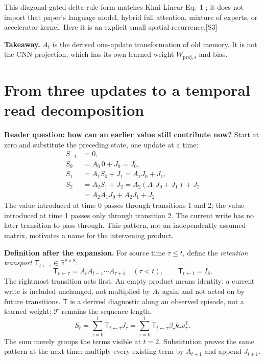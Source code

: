 \documentclass[10pt,letterpaper]{article}
\newcommand{\R}{\mathbb{R}}
\newcommand{\src}[1]{\textcolor{accent}{\textsf{[#1]}}}
\newcommand{\takeaway}[1]{\par\smallskip\noindent\textbf{Takeaway.} #1}
\newcommand{\psection}[1]{\clearpage\section{#1}}
\begin{document}
This diagonal-gated delta-rule form matches Kimi Linear Eq.~1 \cite{kda}; it does not import that paper's language model, hybrid full attention, mixture of experts, or accelerator kernel. Here it is an explicit small spatial recurrence.\src{S3}
\takeaway{$A_t$ is the derived one-update transformation of old memory. It is not the CNN projection, which has its own learned weight $W_{\mathrm{proj},s}$ and bias.}

\psection{From three updates to a temporal read decomposition}
\textbf{Reader question: how can an earlier value still contribute now?}
Start at zero and substitute the preceding state, one update at a time:
\begin{align}
S_{-1}&=0,\\
S_0&=A_0\,0+J_0=J_0,\\
S_1&=A_1S_0+J_1=A_1J_0+J_1,\\
S_2&=A_2S_1+J_2=A_2(A_1J_0+J_1)+J_2\\
&=A_2A_1J_0+A_2J_1+J_2.
\end{align}
The value introduced at time 0 passes through transitions 1 and 2; the value introduced at time 1 passes only through transition 2. The current write has no later transition to pass through. This pattern, not an independently assumed matrix, motivates a name for the intervening product.

\textbf{Definition after the expansion.} For source time $\tau\leq t$, define the \emph{retention transport} $\mathsf T_{t\leftarrow\tau}\in\R^{8\times8}$:
\begin{equation}
\mathsf T_{t\leftarrow\tau}=A_tA_{t-1}\cdots A_{\tau+1}\quad(\tau<t),\qquad
\mathsf T_{t\leftarrow t}=I_8.
\end{equation}
The rightmost transition acts first. An empty product means identity: a current write is included unchanged, not multiplied by $A_t$ again and not acted on by future transitions. $\mathsf T$ is a derived diagnostic along an observed episode, not a learned weight; $\mathcal T$ remains the sequence length.
\begin{equation}
S_t=\sum_{\tau=0}^{t}\mathsf T_{t\leftarrow\tau}J_\tau
=\sum_{\tau=0}^{t}\mathsf T_{t\leftarrow\tau}\beta_\tau k_\tau v_\tau^{\mathsf T}.
\end{equation}
The sum merely groups the terms visible at $t=2$. Substitution proves the same pattern at the next time: multiply every existing term by $A_{t+1}$ and append $J_{t+1}$.
\end{document}
